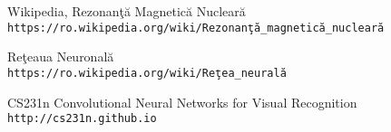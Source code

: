 \begin{thebibliography}{9} 

Wikipedia, Rezonan\c{t}\u{a} Magnetic\u{a} Nuclear\u{a}
\\\texttt{https://ro.wikipedia.org/wiki/Rezonan\c{t}\u{a}\_magnetic\u{a}\_nuclear\u{a}}

Re\c{t}eaua Neuronal\u{a}
\\\texttt{https://ro.wikipedia.org/wiki/Re\c{t}ea\_neural\u{a}}

CS231n Convolutional Neural Networks for Visual Recognition
\\\texttt{http://cs231n.github.io}



\end{thebibliography}